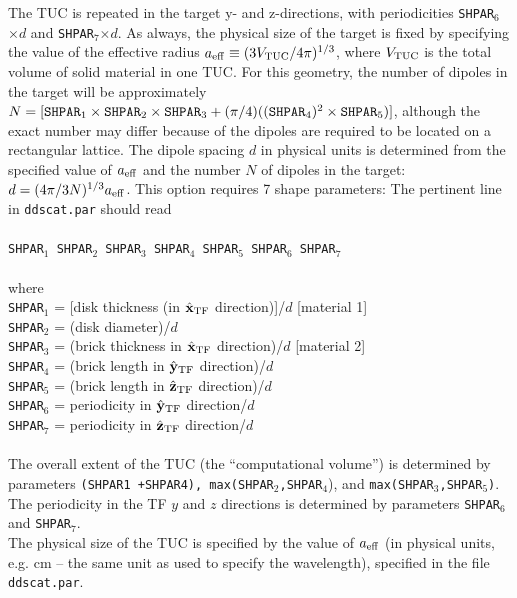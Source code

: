 	    The TUC 
	    is repeated in the target y- and z-directions, with 
	    periodicities {\tt SHPAR$_6$}$\times d$ and 
	    {\tt SHPAR}$_7$$\times d$.
	    As always, the physical size of the target is fixed by
	    specifying the value of the effective radius
	    ${a}_{\rm eff}\equiv(3V_{\rm TUC}/4\pi)^{1/3}$,
	    where $V_{\rm TUC}$ 
	    is the total volume of solid material in one TUC.
	    For this geometry, the number of dipoles in the target will
	    be approximately
	    $N=[{\tt SHPAR}_1\times{\tt SHPAR}_2\times{\tt SHPAR}_3 +
	    (\pi/4)(({\tt SHPAR}_4)^2\times{\tt SHPAR}_5)]$,
	    although the exact number may differ because of the
	    dipoles are required to be located on a rectangular lattice.
	    The dipole spacing $d$ in physical units
	    is determined from the specified value of ${a}_{\rm eff}$ and
	    the number $N$ of dipoles in the target:
	    $d=(4\pi/3N)^{1/3}{a}_{\rm eff}$.
	    This option requires 7 shape parameters:\newline
	    The pertinent line in {\tt ddscat.par} should read\\
	    \ \\
	{\tt SHPAR$_1$ SHPAR$_2$ SHPAR$_3$ SHPAR$_4$ SHPAR$_5$ SHPAR$_6$
         SHPAR$_7$}\\
	    \ \\
	where\\
	{\tt SHPAR$_1$} = [disk thickness (in $\hat{\bf x}_{\rm TF}$ direction)]/$d$ 
        [material 1]\\ 
	{\tt SHPAR$_2$} = (disk diameter)/$d$\\
	{\tt SHPAR}$_3$ = (brick thickness in $\hat{\bf x}_{\rm TF}$ direction)/$d$ 
        [material 2]\\
	{\tt SHPAR}$_4$ = (brick length in $\hat{\bf y}_{\rm TF}$ direction)/$d$\\
	{\tt SHPAR}$_5$ = (brick length in $\hat{\bf z}_{\rm TF}$ direction)/$d$\\
	{\tt SHPAR}$_6$ = periodicity in $\hat{\bf y}_{\rm TF}$ direction/$d$\\
	{\tt SHPAR}$_7$ = periodicity in $\hat{\bf z}_{\rm TF}$ direction/$d$\\
	\ \\
	The overall extent of the TUC (the ``computational volume'')
	is determined by parameters 
	{\tt (SHPAR1 +SHPAR4), max(SHPAR$_2$,SHPAR$_4$}), and 
	{\tt max(SHPAR$_3$,SHPAR$_5$)}.
	The periodicity in the TF $y$ and $z$ directions is determined
	by parameters {\tt SHPAR}$_6$ and {\tt SHPAR}$_7$.\\
	The physical size of the TUC is specified by the value of
	${a}_{\rm eff}$ (in physical units, e.g. cm -- the same unit
        as used to specify the wavelength), 
	specified in the file {\tt ddscat.par}.

